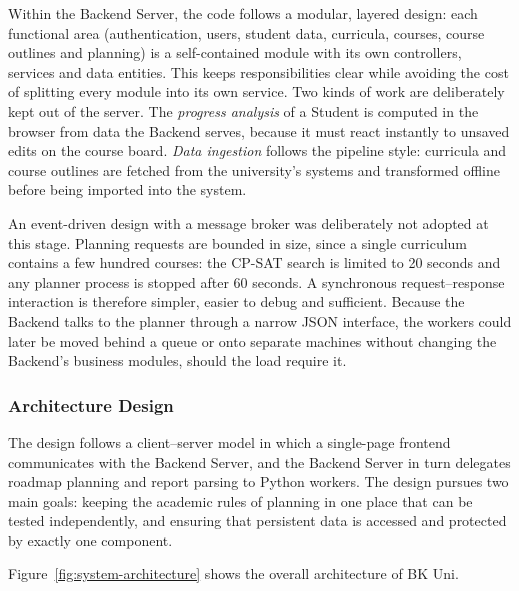 Within the Backend Server, the code follows a modular, layered design: each functional area (authentication, users, student data, curricula, courses, course outlines and planning) is a self-contained module with its own controllers, services and data entities. This keeps responsibilities clear while avoiding the cost of splitting every module into its own service. Two kinds of work are deliberately kept out of the server. The \emph{progress analysis} of a Student is computed in the browser from data the Backend serves, because it must react instantly to unsaved edits on the course board. \emph{Data ingestion} follows the pipeline style: curricula and course outlines are fetched from the university's systems and transformed offline before being imported into the system.

An event-driven design with a message broker was deliberately not adopted at this stage. Planning requests are bounded in size, since a single curriculum contains a few hundred courses: the CP-SAT search is limited to 20 seconds and any planner process is stopped after 60 seconds. A synchronous request--response interaction is therefore simpler, easier to debug and sufficient. Because the Backend talks to the planner through a narrow JSON interface, the workers could later be moved behind a queue or onto separate machines without changing the Backend's business modules, should the load require it.

\subsubsection{Architecture Design}
\label{subsubsec:architecture-overview}

The design follows a client--server model in which a single-page frontend communicates with the Backend Server, and the Backend Server in turn delegates roadmap planning and report parsing to Python workers. The design pursues two main goals: keeping the academic rules of planning in one place that can be tested independently, and ensuring that persistent data is accessed and protected by exactly one component.

Figure~\ref{fig:system-architecture} shows the overall architecture of BK Uni.

